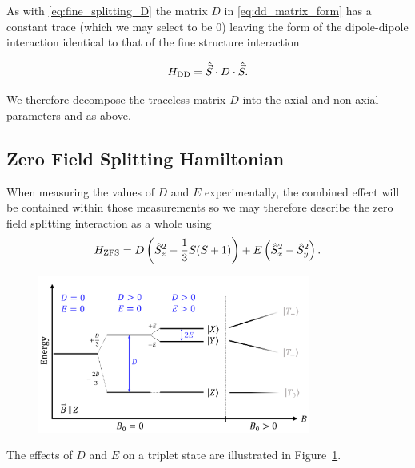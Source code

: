 As with \eqref{eq:fine_splitting_D} the matrix $D$ in \eqref{eq:dd_matrix_form} has a constant trace (which we may select to be $0$) leaving the form of the dipole-dipole interaction identical to that of the fine structure interaction 

\begin{equation}
    H_{\ce{DD}} = \hat{\vec{S}} \cdot D \cdot \hat{\vec{S}}.
\end{equation}

We therefore decompose the traceless matrix $D$ into the axial and non-axial parameters  and  as above. 


\subsection{Zero Field Splitting Hamiltonian}
When measuring the values of $D$ and $E$ experimentally, the combined effect will be contained within those measurements so we may therefore describe the zero field splitting interaction as a whole using 
\begin{equation}
    H_{\ce{ZFS}} =D \left(\hat{S}_z^2 - \frac{1}{3}S(S+1)\right) + E\left(\hat{S}_x^2 - \hat{S}_y^2\right).
    \label{eq:ZFS_hamiltonian}
\end{equation}

\begin{figure}[h]
    \begin{center}
        \includegraphics[width=0.8\textwidth]{figures/ZFS.png}
    \end{center}
    \caption{\cite{SpinStates}}\label{fig:ZFS}
\end{figure}

The effects of $D$ and $E$ on a triplet state are illustrated in Figure~\ref{fig:ZFS}.


